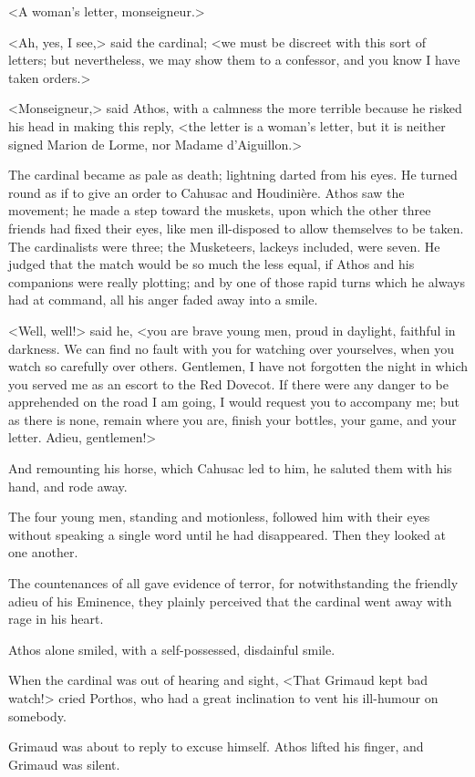 <A woman's letter, monseigneur.> 

<Ah, yes, I see,> said the cardinal; <we must be discreet with this sort of letters; but nevertheless, we may show them to a confessor, and you know I have taken orders.> 

<Monseigneur,> said Athos, with a calmness the more terrible because he risked his head in making this reply, <the letter is a woman's letter, but it is neither signed Marion de Lorme, nor Madame d'Aiguillon.> 

The cardinal became as pale as death; lightning darted from his eyes. He turned round as if to give an order to Cahusac and Houdinière. Athos saw the movement; he made a step toward the muskets, upon which the other three friends had fixed their eyes, like men ill-disposed to allow themselves to be taken. The cardinalists were three; the Musketeers, lackeys included, were seven. He judged that the match would be so much the less equal, if Athos and his companions were really plotting; and by one of those rapid turns which he always had at command, all his anger faded away into a smile. 

<Well, well!> said he, <you are brave young men, proud in daylight, faithful in darkness. We can find no fault with you for watching over yourselves, when you watch so carefully over others. Gentlemen, I have not forgotten the night in which you served me as an escort to the Red Dovecot. If there were any danger to be apprehended on the road I am going, I would request you to accompany me; but as there is none, remain where you are, finish your bottles, your game, and your letter. Adieu, gentlemen!> 

And remounting his horse, which Cahusac led to him, he saluted them with his hand, and rode away. 

The four young men, standing and motionless, followed him with their eyes without speaking a single word until he had disappeared. Then they looked at one another. 

The countenances of all gave evidence of terror, for notwithstanding the friendly adieu of his Eminence, they plainly perceived that the cardinal went away with rage in his heart. 

Athos alone smiled, with a self-possessed, disdainful smile. 

When the cardinal was out of hearing and sight, <That Grimaud kept bad watch!> cried Porthos, who had a great inclination to vent his ill-humour on somebody. 

Grimaud was about to reply to excuse himself. Athos lifted his finger, and Grimaud was silent. 

